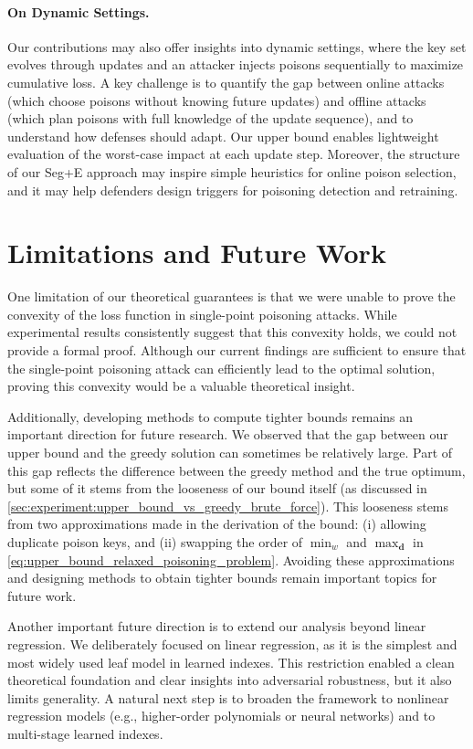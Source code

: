 \documentclass[acmsmall]{acmart}
\begin{document}
\paragraph{On Dynamic Settings.}
Our contributions may also offer insights into dynamic settings, where the key set evolves through updates and an attacker injects poisons sequentially to maximize cumulative loss.
A key challenge is to quantify the gap between online attacks (which choose poisons without knowing future updates) and offline attacks (which plan poisons with full knowledge of the update sequence), and to understand how defenses should adapt.
Our upper bound enables lightweight evaluation of the worst-case impact at each update step.
Moreover, the structure of our Seg+E approach may inspire simple heuristics for online poison selection, and it may help defenders design triggers for poisoning detection and retraining.


\section{Limitations and Future Work}
\label{sec:limitations_and_future_work}

One limitation of our theoretical guarantees is that we were unable to prove the convexity of the loss function in single-point poisoning attacks.
While experimental results consistently suggest that this convexity holds, we could not provide a formal proof.
Although our current findings are sufficient to ensure that the single-point poisoning attack can efficiently lead to the optimal solution, proving this convexity would be a valuable theoretical insight.

Additionally, developing methods to compute tighter bounds remains an important direction for future research.
We observed that the gap between our upper bound and the greedy solution can sometimes be relatively large.
Part of this gap reflects the difference between the greedy method and the true optimum, but some of it stems from the looseness of our bound itself (as discussed in \cref{sec:experiment:upper_bound_vs_greedy_brute_force}).
This looseness stems from two approximations made in the derivation of the bound:
(i) allowing duplicate poison keys, and
(ii) swapping the order of $\min_{w}$ and $\max_{\bm{d}}$ in \cref{eq:upper_bound_relaxed_poisoning_problem}.
Avoiding these approximations and designing methods to obtain tighter bounds remain important topics for future work.

Another important future direction is to extend our analysis beyond linear regression.
We deliberately focused on linear regression, as it is the simplest and most widely used leaf model in learned indexes.
This restriction enabled a clean theoretical foundation and clear insights into adversarial robustness, but it also limits generality.
A natural next step is to broaden the framework to nonlinear regression models (e.g., higher-order polynomials or neural networks) and to multi-stage learned indexes.
\end{document}
